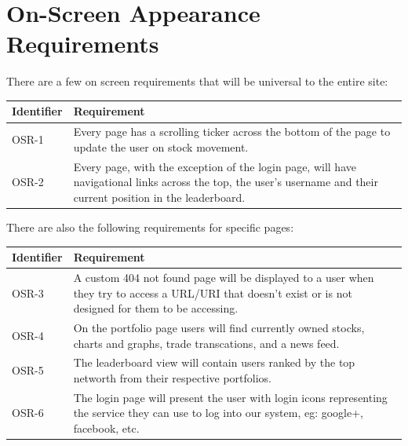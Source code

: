\section{On-Screen Appearance Requirements}



There are a few on screen requirements that will be universal to the entire site:\\
\renewcommand\arraystretch{2}
\begin{longtable}{|p{0.6in}|p{4.6in}|}
\hline
{\large \color{color1}Identifier}&{\large \color{color1}Requirement} \\ \hline

OSR-1& Every page has a scrolling ticker across the bottom of the page to update the user
on stock movement. \\ \hline

OSR-2& Every page, with the exception of the login page, will have
navigational links across the top, the user's username and their current position in
the leaderboard. \\ \hline

\end{longtable}


There are also the following requirements for specific pages:\\

\renewcommand\arraystretch{2}
\begin{longtable}{|p{0.6in}|p{4.6in}|}
\hline
{\large \color{color1}Identifier}&{\large \color{color1}Requirement} \\ \hline

OSR-3&  A custom 404 not found page will be displayed to a user when they try to  access
a URL/URI that doesn't exist or is not designed for them to be accessing. \\ \hline

OSR-4& On the portfolio page users will find currently owned stocks, charts and graphs,
trade transcations, and a news feed. \\ \hline

OSR-5&  The leaderboard view will contain users ranked by the top networth from their
respective portfolios. \\ \hline

OSR-6&  The login page will present the user with login icons representing the service
they can use to log into our system, eg: google+, facebook, etc. \\ \hline

\end{longtable}


